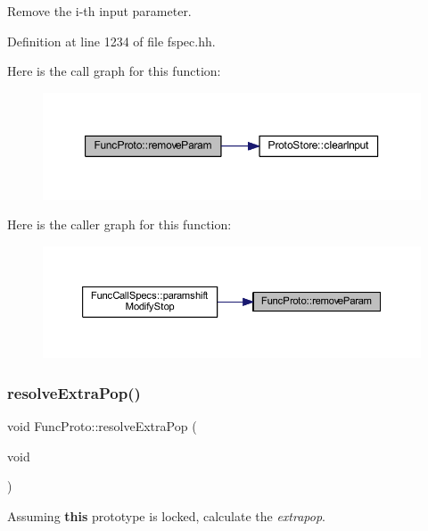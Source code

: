 Remove the i-\/th input parameter. 



Definition at line 1234 of file fspec.\+hh.

Here is the call graph for this function\+:
\nopagebreak
\begin{figure}[H]
\begin{center}
\leavevmode
\includegraphics[width=350pt]{class_func_proto_abc9a8f192846b36ba99ed0464bb10862_cgraph}
\end{center}
\end{figure}
Here is the caller graph for this function\+:
\nopagebreak
\begin{figure}[H]
\begin{center}
\leavevmode
\includegraphics[width=350pt]{class_func_proto_abc9a8f192846b36ba99ed0464bb10862_icgraph}
\end{center}
\end{figure}
\mbox{\label{class_func_proto_a22889d3a526dce245368b8de9c889529}} 
\subsubsection{\texorpdfstring{resolveExtraPop()}{resolveExtraPop()}}
{\footnotesize\ttfamily void Func\+Proto\+::resolve\+Extra\+Pop (\begin{DoxyParamCaption}\item[{void}]{ }\end{DoxyParamCaption})}



Assuming {\bfseries{this}} prototype is locked, calculate the {\itshape extrapop}. 

